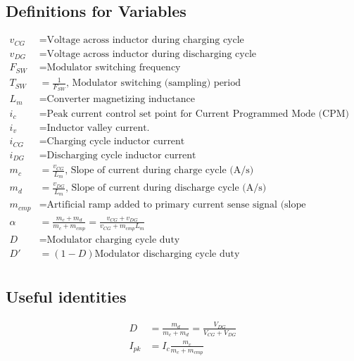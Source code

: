 \documentclass{scrartcl}
\begin{document}
		\subsection{Definitions for Variables}
			
			\begin{align*}
			v_{CG} &= \text{Voltage across inductor during charging cycle} \\
			v_{DG} &= \text{Voltage across inductor during discharging cycle} \\
			F_{SW} &= \text{Modulator switching frequency}\\
			T_{SW} &= \frac{1}{F_{SW}}\text{, Modulator switching (sampling) period} \\
			L_m &= \text{Converter magnetizing inductance} \\
			i_c &= \text{Peak current control set point for Current Programmed Mode (CPM) control}\\
				i_v &= \text{Inductor valley current.} \\
			i_{CG} &= \text{Charging cycle inductor current} \\
			i_{DG} &= \text{Discharging cycle inductor current} \\	
			m_c &= \frac{v_{CG}} {L_m}\text{, Slope of current during charge cycle (A/s)} \\
			m_d &= \frac{v_{DG}} {L_m}\text{, Slope of current during discharge cycle (A/s)}\\
			m_{cmp} &= \text{Artificial ramp added to primary current sense signal (slope compensation) (A/s)}\\
			\alpha &= \frac{m_c + m_d} {m_c + m_{cmp}} =  \frac{v_{CG} + v_{DG}} {v_{CG} + m_{cmp} L_m}\\
			D &= \text{Modulator charging cycle duty} \\
			D' &= (1-D) \text{Modulator discharging cycle duty}\\	
			\end{align*}
			
			\subsection{Useful identities}
			\begin{align}
				D &= \frac{m_d}{m_c + m_d} = \frac{V_{DG}}{V_{CG}+V_{DG}} \label{duty_general}\\
				I_{pk} &= I_c\frac{m_c}{m_c+m_{cmp}} \label{control_to_peak_general}
			\end{align}
\end{document}

